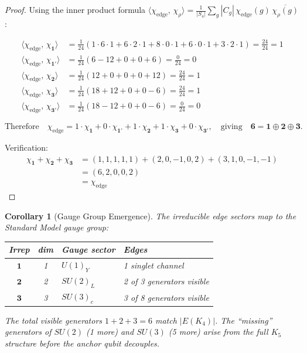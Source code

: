 \documentclass[11pt,a4paper]{article}
\newtheorem{corollary}[theorem]{Corollary}
\theoremstyle{definition}
\begin{document}
\begin{proof}
Using the inner product formula $\langle \chi_{\mathrm{edge}},\, \chi_\rho \rangle = \frac{1}{|S_4|}\sum_g |C_g|\, \chi_{\mathrm{edge}}(g)\, \overline{\chi_\rho(g)}$:

\begin{align}
\langle \chi_{\mathrm{edge}},\, \chi_{\mathbf{1}} \rangle &= \frac{1}{24}(1{\cdot}6{\cdot}1 + 6{\cdot}2{\cdot}1 + 8{\cdot}0{\cdot}1 + 6{\cdot}0{\cdot}1 + 3{\cdot}2{\cdot}1) = \frac{24}{24} = 1 \label{S1:eq:inner1}\\
\langle \chi_{\mathrm{edge}},\, \chi_{\mathbf{1'}} \rangle &= \frac{1}{24}(6 - 12 + 0 + 0 + 6) = \frac{0}{24} = 0 \\
\langle \chi_{\mathrm{edge}},\, \chi_{\mathbf{2}} \rangle &= \frac{1}{24}(12 + 0 + 0 + 0 + 12) = \frac{24}{24} = 1 \\
\langle \chi_{\mathrm{edge}},\, \chi_{\mathbf{3}} \rangle &= \frac{1}{24}(18 + 12 + 0 + 0 - 6) = \frac{24}{24} = 1 \\
\langle \chi_{\mathrm{edge}},\, \chi_{\mathbf{3'}} \rangle &= \frac{1}{24}(18 - 12 + 0 + 0 - 6) = \frac{0}{24} = 0 \label{S1:eq:inner5}
\end{align}

\begin{equation}
\text{Therefore}\quad \chi_{\mathrm{edge}} = 1 \cdot \chi_{\mathbf{1}} + 0 \cdot \chi_{\mathbf{1'}} + 1 \cdot \chi_{\mathbf{2}} + 1 \cdot \chi_{\mathbf{3}} + 0 \cdot \chi_{\mathbf{3'}}, \quad\text{giving}\quad \mathbf{6} = \mathbf{1} \oplus \mathbf{2} \oplus \mathbf{3}.
\end{equation}

Verification: 
\begin{align}
\chi_{\mathbf{1}} + \chi_{\mathbf{2}} + \chi_{\mathbf{3}} & = (1,1,1,1,1) + (2,0,-1,0,2) + (3,1,0,-1,-1) \\ &= (6,2,0,0,2) \\ &= \chi_{\mathrm{edge}}
\end{align}
\end{proof}

\begin{corollary}[Gauge Group Emergence]
\label{S1:cor:gauge}
The irreducible edge sectors map to the Standard Model gauge group:
\begin{center}
\begin{tabular}{ccll}
\toprule
\textbf{Irrep} & \textbf{dim} & \textbf{Gauge sector} & \textbf{Edges} \\
\midrule
$\mathbf{1}$ & 1 & $U(1)_Y$ & 1 singlet channel \\
$\mathbf{2}$ & 2 & $SU(2)_L$ & 2 of 3 generators visible \\
$\mathbf{3}$ & 3 & $SU(3)_c$ & 3 of 8 generators visible \\
\bottomrule
\end{tabular}
\end{center}
The total visible generators $1 + 2 + 3 = 6$ match $|E(K_4)|$. The ``missing'' generators of $SU(2)$ (1 more) and $SU(3)$ (5 more) arise from the full $K_5$ structure before the anchor qubit decouples.
\end{corollary}
\end{document}
